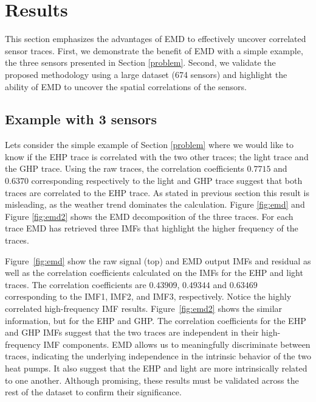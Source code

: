 \section{Results}




This section emphasizes the advantages of EMD to effectively uncover correlated sensor traces.
First, we demonstrate the benefit of EMD with a simple example, the three sensors presented in Section \ref{problem}.
Second, we validate the proposed methodology using a large dataset (674 sensors) and highlight the ability of EMD to uncover the spatial correlations of the sensors.

\subsection{Example with 3 sensors}
Lets consider the simple example of Section \ref{problem} where we would like to know if the EHP trace is correlated with the two other traces; the light trace and the GHP trace.
Using the raw traces, the correlation coefficients $0.7715$ and $0.6370$ corresponding respectively to the light and GHP trace suggest that both traces are correlated to the EHP trace.
As stated in previous section this result is misleading, as the weather trend dominates the calculation.
Figure \ref{fig:emd} and Figure \ref{fig:emd2} shows the EMD decomposition of the three traces.
For each trace EMD has retrieved three IMFs that highlight the higher frequency of the traces.

Figure~\ref{fig:emd} show the raw signal (top) and EMD output IMFs and residual as well as the 
correlation coefficients calculated on the IMFs for the EHP and
light traces.  The correlation coefficients are $0.43909$, $0.49344$ and $0.63469$ corresponding to the IMF1, 
IMF2, and IMF3, respectively.  Notice the highly correlated high-frequency IMF results.
Figure~\ref{fig:emd2} shows the similar information, but for the EHP and GHP.
The correlation coefficients for the EHP and GHP IMFs suggest that the two traces are independent in their 
high-frequency IMF components.
EMD allows us to meaningfully discriminate between traces, indicating the underlying independence in the intrinsic
behavior of the two heat pumps.  It also suggest that the EHP and light are more intrinsically related
to one another.  Although promising, these results must be validated across the rest of the
dataset to confirm their significance.  

